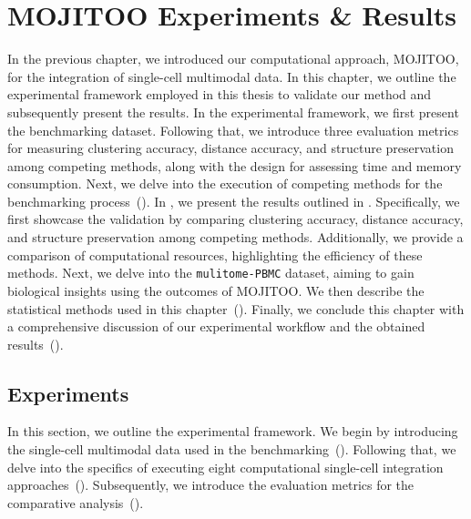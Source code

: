 %
\chapter{MOJITOO Experiments \& Results }
\label{chapter:MOJITOO_bench}

\graphicspath{{chapter4/figs}}
In the previous chapter, we introduced our computational approach, MOJITOO, for the integration of single-cell multimodal data. In this chapter, we outline the experimental framework employed in this thesis to validate our method and subsequently present the results. In the experimental framework, we first present the benchmarking dataset. Following that, we introduce three evaluation metrics for measuring clustering accuracy, distance accuracy, and structure preservation among competing methods, along with the design for assessing time and memory consumption. Next, we delve into the execution of competing methods for the benchmarking process~(). In , we present the results outlined in . Specifically, we first showcase the validation by comparing clustering accuracy, distance accuracy, and structure preservation among competing methods. Additionally, we provide a comparison of computational resources, highlighting the efficiency of these methods. Next, we delve into the \texttt{mulitome-PBMC} dataset, aiming to gain biological insights using the outcomes of MOJITOO. We then describe the statistical methods used in this chapter~(). Finally, we conclude this chapter with a comprehensive discussion of our experimental workflow and the obtained results~().


\section{Experiments}
\label{MOJITOO:exp}
In this section, we outline the experimental framework. We begin by introducing the single-cell multimodal data used in the benchmarking~(). Following that, we delve into the specifics of executing eight computational single-cell integration approaches~(). Subsequently, we introduce the evaluation metrics for the comparative analysis~().

